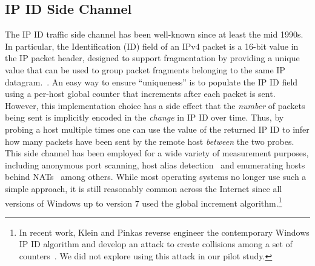 \subsection{IP ID Side Channel}
\label{sec:ipidchannel}
The IP ID traffic side channel has been well-known since at least the
mid 1990s.  In particular, the Identification (ID) field of an IPv4
packet is a 16-bit value in the IP packet header, designed to support
fragmentation by providing a unique value that can be used to group
packet fragments belonging to the same IP
datagram.~\cite{postel1981rfc0791}.  An easy way to ensure
``uniqueness'' is to populate the IP ID field using a per-host global
counter that increments after each packet is sent.  However, this
implementation choice has a side effect that the \emph{number} of
packets being sent is implicitly encoded in the \emph{change} in IP ID
over time.  Thus, by probing a host multiple times one can use the
value of the returned IP ID to infer how many packets have been sent
by the remote host \emph{between} the two probes.  This side channel
has been employed for a wide variety of measurement purposes,
including anonymous port scanning\cite{antirez1998}, host alias
detection~\cite{spring2002measuring} and enumerating hosts behind
NATs~\cite{bellovin2002technique} among others.  While most operating
systems no longer use such a simple approach, it is still reasonably
common across the Internet since all versions of Windows up to version
7 used the global increment algorithm.\footnote{In recent work, Klein
  and Pinkas reverse engineer the contemporary Windows IP ID algorithm
  and develop an attack to create collisions among a set of
  counters~\cite{klein2019ip}.  We did not explore using this attack
  in our pilot study.}



